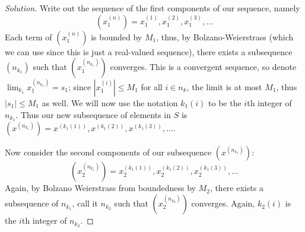 \documentclass{article}
\begin{document}
\begin{proof}[Solution]\let\qed\relax
	Write out the sequence of the first components of our sequence, namely
	\[
		\left(x_1^{(n)}\right) = x_1^{(1)}, x_1^{(2)}, x_1^{(3)}, \dots
	\]
	Each term of $\left(x_1^{(n)}\right)$ is bounded by $M_1$,
	thus, by Bolzano-Weierstrass
	(which we can use since this is just a real-valued sequence),
	there exists a subsequence $(n_{k_1})$ such that
	$\left(x_1^{(n_{k_1})}\right)$ converges.
	This is a convergent sequence,
	so denote $\lim_{k_1} x_1^{(n_{k_1})} = s_1$;
	since $|x_1^{(i)}| \leq M_1$ for all $i \in n_k$,
	the limit is at most $M_1$, thus $|s_1| \leq M_1$ as well.
	We will now use the notation $k_1(i)$ to be the $i$th
	integer of $n_{k_1}$.
	Thus our new subsequence of elements in $S$ is
	$\left(x^{(n_{k_1})}\right) = x^{(k_1(1))}, x^{(k_1(2))}, x^{(k_1(3))}, \dots$.
	
	Now consider the second components of our subsequence $\left(x^{(n_{k_1})}\right)$:
	\[
		\left(x_2^{(n_{k_1})}\right) = x_2^{(k_1(1))}, x_2^{(k_1(2))}, x_2^{(k_1(3))}, \dots
	\]
	Again, by Bolzano Weierstrass from boundedness by $M_2$,
	there exists a subsequence of $n_{k_1}$, call it $n_{k_2}$ such that
	$\left(x_2^{(n_{k_2})}\right)$ converges.
	Again, $k_2(i)$ is the $i$th integer of $n_{k_2}$.
	

\end{proof}
\end{document}
